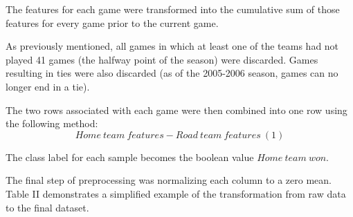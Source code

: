 \documentclass[letterpaper, 10 pt, conference]{ieeeconf}
\begin{document}
The features for each game were transformed into the cumulative sum of those features for every game prior to the current game.

As previously mentioned, all games in which at least one of the teams had not played 41 games (the halfway point of the season) were discarded. Games resulting in ties were also discarded (as of the 2005-2006 season, games can no longer end in a tie).

The two rows associated with each game were then combined into one row using the following method:
$$
Home\ team\ features - Road\ team\ features\ {(1)}
$$


The class label for each sample becomes the boolean value $Home\ team\ won$.

The final step of preprocessing was normalizing each column to a zero mean. Table II demonstrates a simplified example of the transformation from raw data to the final dataset.
\end{document}
